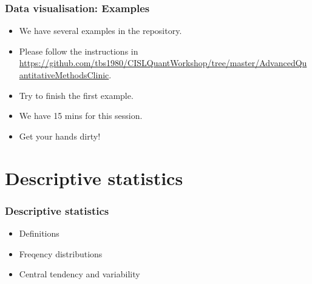 \documentclass[10pt, compress]{beamer}
\begin{document}
\begin{frame}
    \frametitle{Data visualisation: Examples}
    \begin{itemize}
        \item We have several examples in the repository.
        \item Please follow the instructions in \url{https://github.com/tbs1980/CISLQuantWorkshop/tree/master/AdvancedQuantitativeMethodsClinic}.
        \item Try to finish the first example.
        \item We have 15 mins for this session.
        \item Get your hands dirty!
    \end{itemize}
\end{frame}

\section{Descriptive statistics}

\begin{frame}
    \frametitle{Descriptive statistics}
    \begin{itemize}
        \item Definitions
        \item Freqency distributions
        \item Central tendency and variability
    \end{itemize}
\end{frame}
\end{document}
